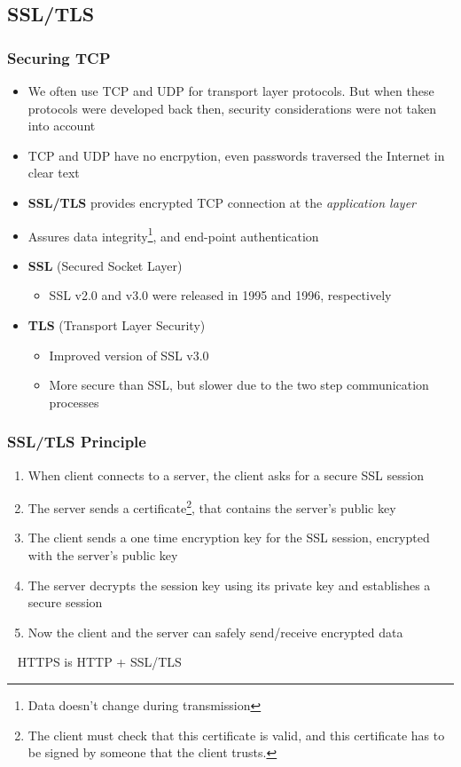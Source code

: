 \subsection{SSL/TLS}
\subsubsection{Securing TCP}
\begin{itemize}
	\item We often use TCP and UDP for transport layer protocols. But when these protocols were developed back then, security considerations were not taken into account
	\item TCP and UDP have no encrpytion, even passwords traversed the Internet in clear text
	\item \textbf{SSL/TLS} provides encrypted TCP connection at the \textit{application layer}
	\item Assures data integrity\footnote{Data doesn't change during transmission}, and end-point authentication
	\item \textbf{SSL} (Secured Socket Layer)
	\begin{itemize}
		\item SSL v2.0 and v3.0 were released in 1995 and 1996, respectively
	\end{itemize}
	\item \textbf{TLS} (Transport Layer Security)
	\begin{itemize}
		\item Improved version of SSL v3.0
		\item More secure than SSL, but slower due to the two step communication processes
	\end{itemize}
\end{itemize}

\subsubsection{SSL/TLS Principle}
\begin{enumerate}
	\item When client connects to a server, the client asks for a secure SSL session
	\item The server sends a certificate\footnote{The client must check that this certificate is valid, and this certificate has to be signed by someone that the client trusts.}, that contains the server's public key
	\item The client sends a one time encryption key for the SSL session, encrypted with the server's public key
	\item The server decrypts the session key using its private key and establishes a secure session
	\item Now the client and the server can safely send/receive encrypted data
\end{enumerate}~
HTTPS is HTTP + SSL/TLS

